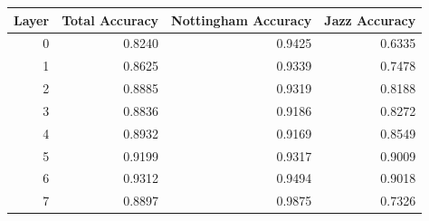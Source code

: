 \begin{tabular}{rrrr}
\toprule
Layer & Total Accuracy & Nottingham Accuracy & Jazz Accuracy \\
\midrule
0 & 0.8240 & 0.9425 & 0.6335 \\
1 & 0.8625 & 0.9339 & 0.7478 \\
2 & 0.8885 & 0.9319 & 0.8188 \\
3 & 0.8836 & 0.9186 & 0.8272 \\
4 & 0.8932 & 0.9169 & 0.8549 \\
5 & 0.9199 & 0.9317 & 0.9009 \\
6 & 0.9312 & 0.9494 & 0.9018 \\
7 & 0.8897 & 0.9875 & 0.7326 \\
\bottomrule
\end{tabular}
